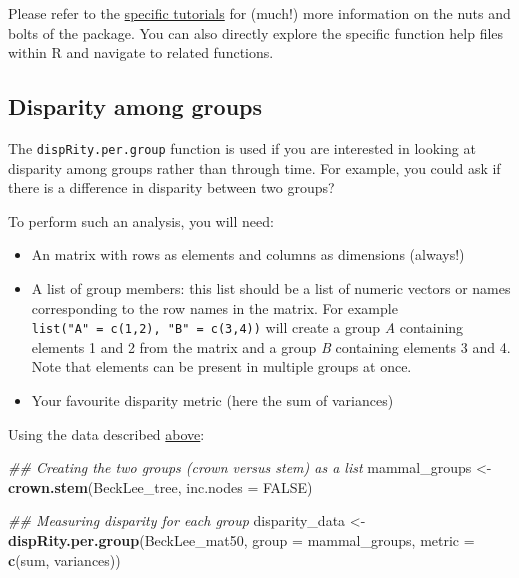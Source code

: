 \documentclass[]{book}
\newenvironment{Shaded}{\begin{snugshade}}{\end{snugshade}}
\newcommand{\CommentTok}[1]{\textcolor[rgb]{0.56,0.35,0.01}{\textit{#1}}}
\newcommand{\DataTypeTok}[1]{\textcolor[rgb]{0.13,0.29,0.53}{#1}}
\newcommand{\KeywordTok}[1]{\textcolor[rgb]{0.13,0.29,0.53}{\textbf{#1}}}
\newcommand{\NormalTok}[1]{#1}
\newcommand{\OtherTok}[1]{\textcolor[rgb]{0.56,0.35,0.01}{#1}}
\newcommand{\StringTok}[1]{\textcolor[rgb]{0.31,0.60,0.02}{#1}}
\providecommand{\tightlist}{%
  \setlength{\itemsep}{0pt}\setlength{\parskip}{0pt}}
\begin{document}
Please refer to the \protect\hyperlink{specific-tutorial}{specific tutorials} for (much!) more information on the nuts and bolts of the package.
You can also directly explore the specific function help files within R and navigate to related functions.

\hypertarget{disparity-among-groups}{%
\subsection{Disparity among groups}\label{disparity-among-groups}}

The \texttt{dispRity.per.group} function is used if you are interested in looking at disparity among groups rather than through time.
For example, you could ask if there is a difference in disparity between two groups?

To perform such an analysis, you will need:

\begin{itemize}
\tightlist
\item
  An matrix with rows as elements and columns as dimensions (always!)
\item
  A list of group members: this list should be a list of numeric vectors or names corresponding to the row names in the matrix. For example \texttt{list("A"\ =\ c(1,2),\ "B"\ =\ c(3,4))} will create a group \emph{A} containing elements 1 and 2 from the matrix and a group \emph{B} containing elements 3 and 4. Note that elements can be present in multiple groups at once.
\item
  Your favourite disparity metric (here the sum of variances)
\end{itemize}

Using the \citet{beckancient2014} data described \protect\hyperlink{example-data}{above}:

\begin{Shaded}
\begin{Highlighting}[]
\CommentTok{## Creating the two groups (crown versus stem) as a list}
\NormalTok{mammal_groups <-}\StringTok{ }\KeywordTok{crown.stem}\NormalTok{(BeckLee_tree, }\DataTypeTok{inc.nodes =} \OtherTok{FALSE}\NormalTok{)}

\CommentTok{## Measuring disparity for each group}
\NormalTok{disparity_data <-}\StringTok{ }\KeywordTok{dispRity.per.group}\NormalTok{(BeckLee_mat50,}
                                     \DataTypeTok{group =}\NormalTok{ mammal_groups,}
                                     \DataTypeTok{metric =} \KeywordTok{c}\NormalTok{(sum, variances))}
\end{Highlighting}
\end{Shaded}
\end{document}

